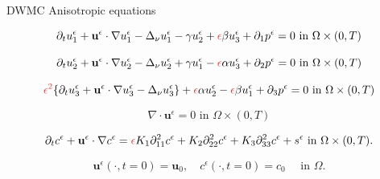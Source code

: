 \documentclass{beamer}
\begin{document}
\begin{frame}{DWMC Anisotropic equations}

\begin{equation} \nonumber
  \partial_t u^\epsilon _1 + \mathbf{u}^\epsilon \cdot \nabla u^\epsilon _1 -\Delta_\nu u^\epsilon _1 -\gamma u_2^\epsilon + \textcolor{jasper}{\epsilon} \beta u_3^\epsilon + \partial_1 p^\epsilon = 0 \text{ in } \Omega \times (0,T)
\end{equation}

\begin{equation} \nonumber
  \partial_t u_2^\epsilon + \mathbf{u}^\epsilon \cdot \nabla u_2^\epsilon -\Delta_\nu u_2^\epsilon + \gamma u_1^\epsilon - \textcolor{jasper}{\epsilon} \alpha u^\epsilon_3  + \partial_2 p^\epsilon = 0 \text{ in } \Omega \times (0,T)
\end{equation}

\begin{equation} \nonumber
  \textcolor{jasper}{\epsilon^2} \{  \partial_t u_3^\epsilon + \mathbf{u}^\epsilon \cdot \nabla u_3^\epsilon -\Delta_\nu u_3^{\epsilon} \} + \textcolor{jasper}{\epsilon} \alpha u^\epsilon_2 - \textcolor{jasper}{\epsilon} \beta u_1^\epsilon + \partial_3 p^\epsilon = 0 \text{ in } \Omega \times (0,T)
\end{equation}

\begin{equation} \nonumber
  \nabla \cdot \mathbf{u}^\epsilon= 0 \text{ in } \Omega \times (0,T)
\end{equation}

\begin{equation} \nonumber
   \partial_t c^\epsilon + \mathbf{u^\epsilon} \cdot \nabla c^\epsilon = \textcolor{jasper}{\epsilon} K_1 \partial_{11} ^ 2 c^\epsilon + K_2 \partial_{22} ^ 2 c^\epsilon + K_3 \partial_{33} ^ 2 c^\epsilon + s^\epsilon \text{ in } \Omega \times (0,T).
\end{equation}
    
\begin{equation} \nonumber
  \mathbf{u}^\epsilon (\cdot, t = 0) = \mathbf{u}_0, \quad c^\epsilon (\cdot, t=0) = c_0  \quad \text{ in } \Omega.
\end{equation}

\end{frame}
\end{document}
